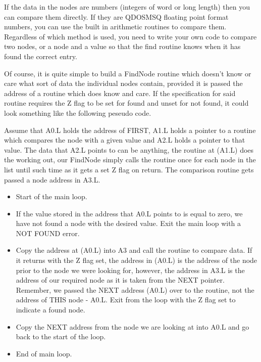 If the data in the nodes are numbers (integers of word or long
      length) then you can compare them directly. If they are QDOSMSQ floating
      point format numbers, you can use the built in arithmetic routines to
      compare them. Regardless of which method is used, you need to write your
      own code to compare two nodes, or a node and a value so that the find
      routine knows when it has found the correct entry.

Of course, it is quite simple to build a FindNode routine which
      doesn't know or care what sort of data the individual nodes contain,
      provided it is passed the address of a routine which does know and care.
      If the specification for said routine requires the Z flag to be set for
      found and unset for not found, it could look something like the
      following peseudo code.

Assume that A0.L holds the address of FIRST, A1.L holds a pointer
      to a routine which compares the node with a given value and A2.L holds a
      pointer to that value. The data that A2.L points to can be anything, the
      routine at (A1.L) does the working out, our FindNode simply calls the
      routine once for each node in the list until such time as it gets a set
      Z flag on return. The comparison routine gets passed a node address in
      A3.L.
\begin{itemize}[itemsep=0pt]

\item{}Start of the main loop.


\item{}If the value stored in the address that A0.L points to is
          equal to zero, we have not found a node with the desired value. Exit
          the main loop with a NOT FOUND error.


\item{}Copy the address at (A0.L) into A3 and call the routine to
          compare data. If it returns with the Z flag set, the address in
          (A0.L) is the address of the node prior to the node we were looking
          for, however, the address in A3.L is the address of our required
          node as it is taken from the NEXT pointer. Remember, we passed the
          NEXT address (A0.L) over to the routine, not the address of THIS
          node -{} A0.L. Exit from the loop with the Z flag set to indicate a
          found node.


\item{}Copy the NEXT address from the node we are looking at into
          A0.L and go back to the start of the loop.


\item{}End of main loop.

\end{itemize}

